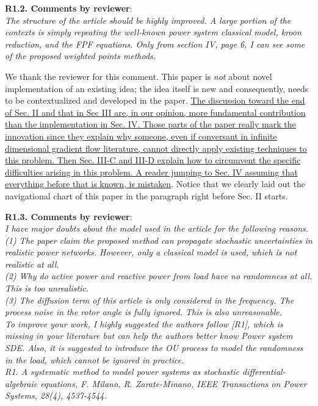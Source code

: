\documentclass[12pt,onecolumn]{IEEEtran}
\newcommand{\blue}{\color{blue}}
\newcommand{\nib}{\noindent  {\bf Response:} }
\begin{document}
\noindent
{\bf R1.2. Comments by reviewer}:\\
{\em The structure of the article should be highly improved. A large portion of the contexts is simply repeating the well-known power system classical model, kroon reduction, and the FPF equations.  Only from section IV, page 6, I can see some of the proposed weighted points methods.}


{\nib{ \blue We thank the reviewer for this comment. This paper is \emph{not} about novel implementation of an existing idea; the idea itself is new and consequently, needs to be contextualized and developed in the paper. \ul{The discussion toward the end of Sec. II and that in Sec III are, in our opinion, more fundamental contribution than the implementation in Sec. IV. Those parts of the paper really mark the innovation since they explain why someone, even if conversant in infinite dimensional gradient flow literature, cannot directly apply existing techniques to this problem. Then Sec. III-C and III-D explain how to circumvent the specific difficulties arising in this problem. A reader jumping to Sec. IV assuming that everything before that is known, is mistaken}. Notice that we clearly laid out the navigational chart of this paper in the paragraph right before Sec. II starts.}}


\noindent
{\bf R1.3. Comments by reviewer}:\\
{\em I have major doubts about the model used in the article for the following reasons.\\
(1)     The paper claim the proposed method can propagate stochastic uncertainties in realistic power networks. However, only a classical model is used, which is not realistic at all.\\
(2)     Why do active power and reactive power from load have no randomness at all. This is too unrealistic.\\
(3)     The diffusion term of this article is only considered in the frequency. The process noise in the rotor angle is fully ignored. This is also unreasonable.\\
To improve your work, I highly suggested the authors follow [R1], which is missing in your literature but can help the authors better know Power system SDE.  Also, it is suggested to introduce the OU process to model the randomness in the load, which cannot be ignored in practice.\\
R1. A systematic method to model power systems as stochastic differential-algebraic equations, F. Milano, R. Zarate-Minano, IEEE Transactions on Power Systems, 28(4), 4537-4544.}
\end{document}
